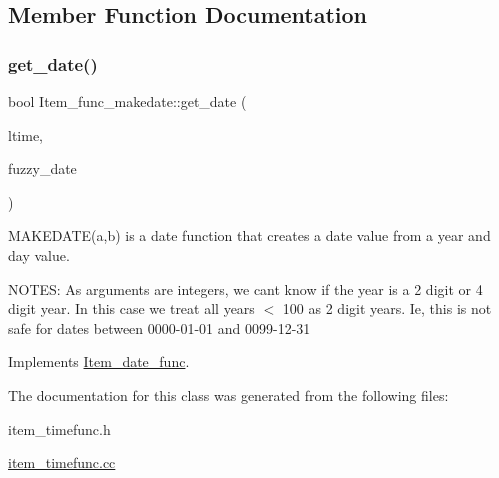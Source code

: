 \subsection{Member Function Documentation}
\mbox{\label{classItem__func__makedate_a5cf64b7ab373a5ae48f1338e6fffd00f}} 
\subsubsection{\texorpdfstring{get\+\_\+date()}{get\_date()}}
{\footnotesize\ttfamily bool Item\+\_\+func\+\_\+makedate\+::get\+\_\+date (\begin{DoxyParamCaption}\item[{M\+Y\+S\+Q\+L\+\_\+\+T\+I\+ME $\ast$}]{ltime,  }\item[{my\+\_\+time\+\_\+flags\+\_\+t}]{fuzzy\+\_\+date }\end{DoxyParamCaption})\hspace{0.3cm}{\ttfamily [virtual]}}

M\+A\+K\+E\+D\+A\+T\+E(a,b) is a date function that creates a date value from a year and day value.

N\+O\+T\+ES\+: As arguments are integers, we can\textquotesingle{}t know if the year is a 2 digit or 4 digit year. In this case we treat all years $<$ 100 as 2 digit years. Ie, this is not safe for dates between 0000-\/01-\/01 and 0099-\/12-\/31 

Implements \mbox{\hyperlink{classItem__date__func}{Item\+\_\+date\+\_\+func}}.



The documentation for this class was generated from the following files\+:\begin{DoxyCompactItemize}
\item 
item\+\_\+timefunc.\+h\item 
\mbox{\hyperlink{item__timefunc_8cc}{item\+\_\+timefunc.\+cc}}\end{DoxyCompactItemize}
